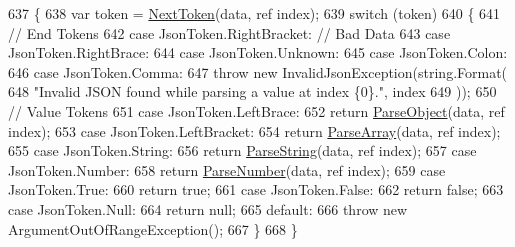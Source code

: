 \begin{DoxyCode}
637         \{
638             var token = \hyperlink{a00060_a1d2daab9b052b186da7a2b6711be5803}{NextToken}(data, ref index);
639             \textcolor{keywordflow}{switch} (token)
640             \{
641                 \textcolor{comment}{// End Tokens}
642                 \textcolor{keywordflow}{case} JsonToken.RightBracket:    \textcolor{comment}{// Bad Data}
643                 \textcolor{keywordflow}{case} JsonToken.RightBrace:
644                 \textcolor{keywordflow}{case} JsonToken.Unknown:
645                 \textcolor{keywordflow}{case} JsonToken.Colon:
646                 \textcolor{keywordflow}{case} JsonToken.Comma:
647                     \textcolor{keywordflow}{throw} \textcolor{keyword}{new} InvalidJsonException(\textcolor{keywordtype}{string}.Format(
648                             \textcolor{stringliteral}{"Invalid JSON found while parsing a value at index \{0\}."}, index
649                             ));
650                 \textcolor{comment}{// Value Tokens}
651                 \textcolor{keywordflow}{case} JsonToken.LeftBrace:
652                     \textcolor{keywordflow}{return} \hyperlink{a00060_a49577a43cf31e147b6d46ea28f7f617e}{ParseObject}(data, ref index);
653                 \textcolor{keywordflow}{case} JsonToken.LeftBracket:
654                     \textcolor{keywordflow}{return} \hyperlink{a00060_ae0b95fd2671c34c64b6a2c6275d69111}{ParseArray}(data, ref index);
655                 \textcolor{keywordflow}{case} JsonToken.String:
656                     \textcolor{keywordflow}{return} \hyperlink{a00060_a7e18de40259814b5ab9d0100bdeab4fe}{ParseString}(data, ref index);
657                 \textcolor{keywordflow}{case} JsonToken.Number:
658                     \textcolor{keywordflow}{return} \hyperlink{a00060_ae0f7085f6d03e4e5cfcba42467cbd0b8}{ParseNumber}(data, ref index);
659                 \textcolor{keywordflow}{case} JsonToken.True:
660                     \textcolor{keywordflow}{return} \textcolor{keyword}{true};
661                 \textcolor{keywordflow}{case} JsonToken.False:
662                     \textcolor{keywordflow}{return} \textcolor{keyword}{false};
663                 \textcolor{keywordflow}{case} JsonToken.Null:
664                     \textcolor{keywordflow}{return} null;
665                 \textcolor{keywordflow}{default}:
666                     \textcolor{keywordflow}{throw} \textcolor{keyword}{new} ArgumentOutOfRangeException();
667             \}
668         \}
\end{DoxyCode}
